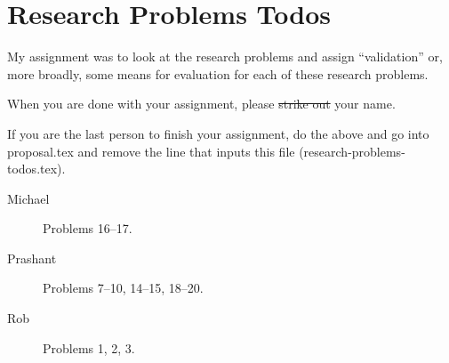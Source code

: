 \section*{Research Problems Todos}

My assignment was to look at the research problems and assign ``validation'' or, more broadly, some means for evaluation for each of these research problems.

When you are done with your assignment, please \sout{strike out} your name.

If you are the last person to finish your assignment, do the above and go into proposal.tex and remove the line that inputs this file (research-problems-todos.tex).

\begin{description}
\item[Michael] Problems 16--17.
\item[Prashant] Problems 7--10, 14--15, 18--20.
\item[Rob] Problems 1, 2, 3.
\end{description}

\newpage